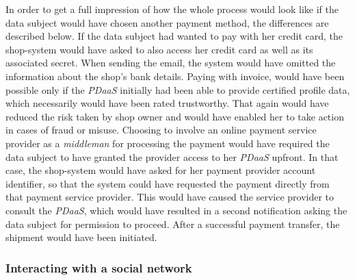 \documentclass[12pt,english,a4paper,titlepage,cleardoublepage=empty,dottedtoc]{report}
\begin{document}
In order to get a full impression of how the whole process would look
like if the data subject would have chosen another payment method, the
differences are described below. If the data subject had wanted to pay
with her credit card, the shop-system would have asked to also access
her credit card as well as its associated secret. When sending the
email, the system would have omitted the information about the shop's
bank details. Paying with invoice, would have been possible only if the
\emph{PDaaS} initially had been able to provide certified profile data,
which necessarily would have been rated trustworthy. That again would
have reduced the risk taken by shop owner and would have enabled her to
take action in cases of fraud or misuse. Choosing to involve an online
payment service provider as a \emph{middleman} for processing the
payment would have required the data subject to have granted the
provider access to her \emph{PDaaS} upfront. In that case, the
shop-system would have asked for her payment provider account
identifier, so that the system could have requested the payment directly
from that payment service provider. This would have caused the service
provider to consult the \emph{PDaaS}, which would have resulted in a
second notification asking the data subject for permission to proceed.
After a successful payment transfer, the shipment would have been
initiated.

\subsubsection*{Interacting with a social
network}\label{interacting-with-a-social-network}
\end{document}
